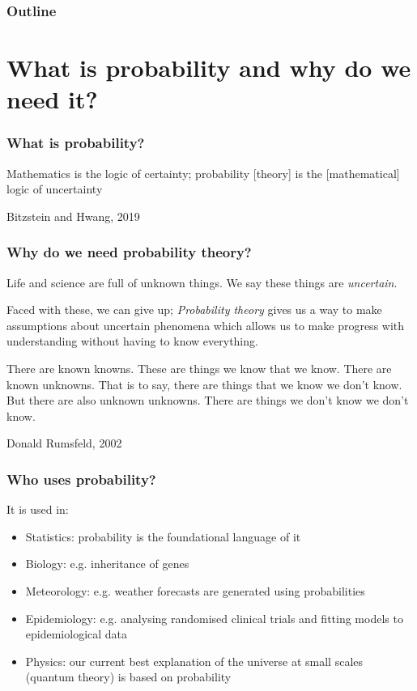 \documentclass{beamer}
\begin{document}
	\begin{frame}
		\frametitle{Outline}
		\tableofcontents
	\end{frame}

	\section{What is probability and why do we need it?}
	\frame{\tableofcontents[currentsection]}
	
	\begin{frame}
		\frametitle{What is probability?}
		\epigraph{Mathematics is the logic of certainty; probability [theory] is the [mathematical] logic of uncertainty}{Bitzstein and Hwang, 2019}
		
	\end{frame}

	\begin{frame}
		\frametitle{Why do we need probability theory?}
		
		Life and science are full of unknown things. We say these things are \textit{uncertain}.
		
		Faced with these, we can give up; \textit{Probability theory} gives us a way to make assumptions about uncertain phenomena which allows us to make progress with understanding without having to know everything.
		
		\epigraph{There are known knowns. These are things we know that we know. There are known unknowns. That is to say, there are things that we know we don't know. But there are also unknown unknowns. There are things we don't know we don't know.}{Donald Rumsfeld, 2002}
		
	\end{frame}
	
	\begin{frame}
		\frametitle{Who uses probability?}
		It is used in:
		
		\begin{itemize}
			\item Statistics: probability is the foundational language of it
			\item Biology: e.g. inheritance of genes
			\item Meteorology: e.g. weather forecasts are generated using probabilities
			\item Epidemiology: e.g. analysing randomised clinical trials and fitting models to epidemiological data
			\item Physics: our current best explanation of the universe at small scales (quantum theory) is based on probability
		\end{itemize}
		
		
	\end{frame}
\end{document}
